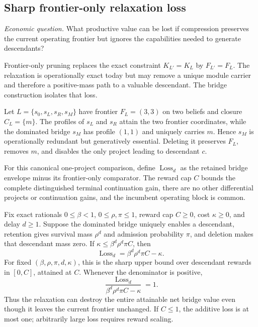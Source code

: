 \subsection{Sharp frontier-only relaxation loss}

\emph{Economic question.}  What productive value can be lost if compression
preserves the current operating frontier but ignores the capabilities needed
to generate descendants?

Frontier-only pruning replaces the exact constraint \(K_{L'}=K_L\) by
\(F_{L'}=F_L\).  The relaxation is operationally exact today but may remove a
unique module carrier and therefore a positive-mass path to a valuable
descendant.  The bridge construction isolates that loss.

Let
\(L=\{s_0,s_L,s_R,s_M\}\) have frontier
\(F_L=(3,3)\) on two beliefs and closure \(C_L=\{m\}\).  The profiles of
\(s_L\) and \(s_R\) attain the two frontier coordinates, while the dominated
bridge \(s_M\) has profile \((1,1)\) and uniquely carries \(m\).  Hence
\(s_M\) is operationally redundant but generatively essential.  Deleting it
preserves \(F_L\), removes \(m\), and disables the only project leading to
descendant \(c\).

For this canonical one-project comparison, define
\(\operatorname{Loss}_d\) as the retained bridge envelope minus its
frontier-only comparator.  The reward cap \(C\) bounds the complete
distinguished terminal continuation gain, there are no other differential
projects or continuation gains, and the incumbent operating block is common.

\begin{theorem}
\label{thm:normalized-frontier-pruning-loss}
Fix exact rationals \(0\le\beta<1\), \(0\le\rho,\pi\le1\), reward cap
\(C\ge0\), cost \(\kappa\ge0\), and delay \(d\ge1\).  Suppose the dominated
bridge uniquely enables a descendant, retention gives survival mass
\(\rho^d\) and admission probability \(\pi\), and deletion makes that
descendant mass zero.  If \(\kappa\le\beta^d\rho^d\pi C\), then
\begin{equation}\label{eq:normalized-pruning-loss}
 \operatorname{Loss}_d
 =\beta^d\rho^d\pi C-\kappa.
\end{equation}
For fixed \((\beta,\rho,\pi,d,\kappa)\), this is the sharp upper bound over
descendant rewards in \([0,C]\), attained at \(C\).  Whenever the denominator
is positive,
\[
 \frac{\operatorname{Loss}_d}
 {\beta^d\rho^d\pi C-\kappa}=1.
\]
Thus the relaxation can destroy the entire attainable net bridge value even
though it leaves the current frontier unchanged.  If \(C\le1\), the additive
loss is at most one; arbitrarily large loss requires reward scaling.
\end{theorem}

